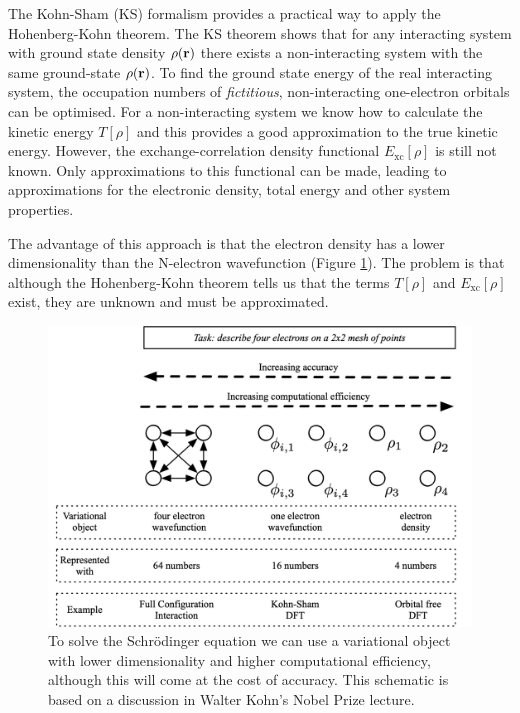 The Kohn-Sham (KS) formalism provides a practical way to apply the Hohenberg-Kohn theorem. The KS theorem shows that for any interacting system with ground state density $\rho(\textbf{\textrm{r}})$ there exists a non-interacting system with the same ground-state $\rho(\textbf{\textrm{r}})$. To find the ground state energy of the real interacting system, the occupation numbers of \textit{fictitious}, non-interacting one-electron orbitals can be optimised. For a non-interacting system we know how to calculate the kinetic energy $T\left[\rho\right]$ and this provides a good approximation to the true kinetic energy. However, the exchange-correlation density functional $E_{\textrm{xc}}\left[\rho\right]$ is still not known. Only approximations to this functional can be made, leading to approximations for the electronic density, total energy and other system properties.

The advantage of this approach is that the electron density has a lower dimensionality than the N-electron wavefunction (Figure \ref{dimensions}).\autocite{Perdew2010,Kohn1999} The problem is that although the Hohenberg-Kohn theorem tells us that the terms $T\left[\rho\right]$ and $E_{\textrm{xc}}\left[\rho\right]$ exist, they are unknown and must be approximated.

\begin{figure}[h]
\centering
  \includegraphics[width=0.8\columnwidth]{figures/ch3/dimensions.png}
  \caption[Dimensionality of variational objects]{To solve the Schr\"{o}dinger equation we can use a variational object with lower dimensionality and higher computational efficiency, although this will come at the cost of accuracy. This schematic is based on a discussion in Walter Kohn's Nobel Prize lecture.\autocite{Kohn1999}}
  \label{dimensions}
\end{figure}


